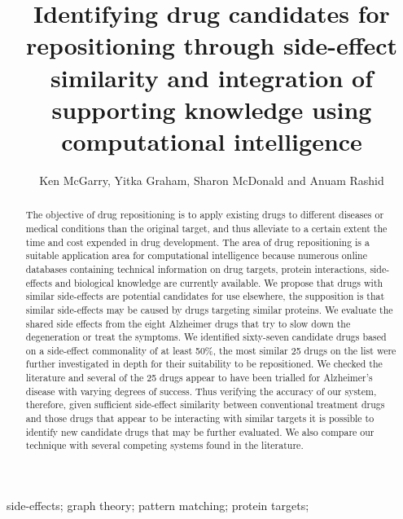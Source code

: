 \documentclass[preprint,12pt]{elsarticle}
\begin{document}
 
\begin{frontmatter}
\title{Identifying drug candidates for repositioning through side-effect similarity and integration of supporting knowledge using computational intelligence}
\author{Ken McGarry, Yitka Graham, Sharon McDonald and Anuam Rashid}
\address{School of Pharmacy and Pharmaceutical Sciences, Faculty of Health Sciences and Wellbeing,\\University of Sunderland, UK}

\begin{abstract}
The objective of drug repositioning is to apply existing drugs to different diseases or medical conditions than the original target, and thus alleviate to a certain extent the time and cost expended in drug development. The area of drug repositioning is a suitable application area for computational intelligence because numerous online databases containing technical information on drug targets, protein interactions, side-effects and biological knowledge are currently available. We propose that drugs with similar side-effects are potential candidates for use elsewhere, the supposition is that similar side-effects may be caused by drugs targeting similar proteins.  We evaluate the shared side effects from the eight Alzheimer drugs that try to slow down the degeneration or treat the symptoms. We identified sixty-seven candidate drugs based on a side-effect commonality of at least 50\%, the most similar 25 drugs on the list were further investigated in depth for their suitability to be repositioned. We checked the literature and several of the 25 drugs appear to have been trialled for Alzheimer's disease with varying degrees of success. Thus verifying the accuracy of our system, therefore, given sufficient side-effect similarity between conventional treatment drugs and those drugs that appear to be interacting with similar targets it is possible to identify new candidate drugs that may be further evaluated. We also compare our technique with several competing systems found in the literature.
\end{abstract}

\begin{keyword}
side-effects; graph theory; pattern matching; protein targets;
\end{keyword}

\end{frontmatter}
\end{document}
